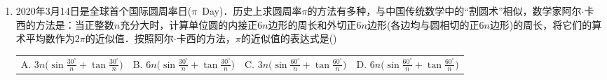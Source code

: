 \begin{description}
\begin{enumerate}[leftmargin=5pt]
        \item 2020年3月14日是全球首个国际圆周率日($\pi$~Day)．历史上求圆周率$\pi$的方法有多种，与中国传统数学中的``割圆术''相似，数学家阿尔$\cdot$卡西的方法是：当正整数$n$充分大时，计算单位圆的内接正$6n$边形的周长和外切正$6n$边形(各边均与圆相切的正$6n$边形)的周长，将它们的算术平均数作为$2\pi$的近似值．按照阿尔$\cdot$卡西的方法，$\pi$的近似值的表达式是(\quad)
     
        {\centering\begin{tabular*}{\linewidth}{@{}@{\extracolsep{\fill}}llll@{}}
            \(\text{A. }3n\bigl(\sin\frac{30^\circ}{n}+\tan\frac{30^\circ}{n}\bigr)\)  & \(\text{B. }6n\bigl(\sin\frac{30^\circ}{n}+\tan\frac{30^\circ}{n}\bigr)\)  & \(\text{C. }3n\bigl(\sin\frac{60^\circ}{n}+\tan\frac{60^\circ}{n}\bigr)\)  & \(\text{D. }6n\bigl(\sin\frac{60^\circ}{n}+\tan\frac{60^\circ}{n}\bigr)\)
        \end{tabular*}\par}
    \end{enumerate}


\end{description}
